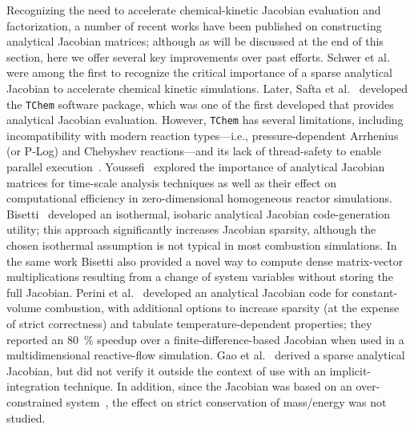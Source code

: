 \documentclass[12pt,number,sort&compress,preprint]{elsarticle}
\begin{document}
Recognizing the need to accelerate chemical-kinetic Jacobian evaluation and factorization, a number of recent works have been published on constructing analytical Jacobian matrices; although as will be discussed at the end of this section, here we offer several key improvements over past efforts.
Schwer et al.~\cite{SCHWER2002270} were among the first to recognize the critical importance of a sparse analytical Jacobian to accelerate chemical kinetic simulations.
Later, Safta et al.~\cite{Safta:2011vn} developed the \texttt{TChem} software package, which was one of the first developed that provides analytical Jacobian evaluation. However, \texttt{TChem} has several limitations, including incompatibility with modern reaction types---i.e., pressure-dependent Arrhenius (or P-Log) and Chebyshev reactions---and its lack of thread-safety to enable parallel execution~\cite{Curtis2017:tchem}.
Youssefi~\cite{Youssefi:2011tm} explored the importance of analytical Jacobian matrices for time-scale analysis techniques as well as their effect on computational efficiency in zero-dimensional homogeneous reactor simulations.
Bisetti~\cite{Bisetti:2012jw} developed an isothermal, isobaric analytical Jacobian code-generation utility;
this approach significantly increases Jacobian sparsity, although the chosen isothermal assumption is not typical in most combustion simulations.
In the same work Bisetti also provided a novel way to compute dense matrix-vector multiplications resulting from a change of system variables without storing the full Jacobian.
Perini et al.~\cite{Perini:2012gy} developed an analytical Jacobian code for constant-volume combustion, with additional options to increase sparsity (at the expense of strict correctness) and tabulate temperature-dependent properties; they reported an \SI{80}{\percent} speedup over a finite-difference-based Jacobian when used in a multidimensional reactive-flow simulation.
Gao et al.~\cite{GAO2015287} derived a sparse analytical Jacobian, but did not verify it outside the context of use with an implicit-integration technique.
In addition, since the Jacobian was based on an over-constrained system~\cite{HANSEN2018257}, the effect on strict conservation of mass\slash energy was not studied.
\end{document}
